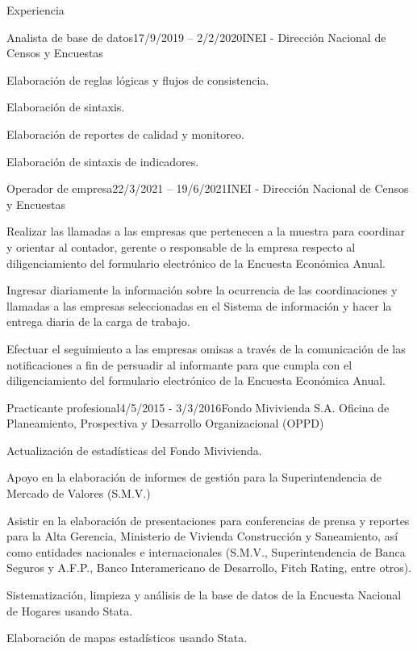 \documentclass[
11pt, %
]{resume} %
\begin{document}
\begin{rSection}{Experiencia}
			
			\begin{rSubsection}{Analista de base de datos}{17/9/2019 – 2/2/2020}{INEI - Dirección Nacional de Censos y Encuestas}{}
				\item Elaboración de reglas lógicas y flujos de consistencia.
				\item Elaboración de sintaxis.
				\item Elaboración de reportes de calidad y monitoreo.
				\item Elaboración de sintaxis de indicadores.
			\end{rSubsection}
			
			
			\begin{rSubsection}{Operador de empresa}{22/3/2021 – 19/6/2021}{INEI - Dirección Nacional de Censos y Encuestas}{}
				\item Realizar las llamadas a las empresas que pertenecen a la muestra para coordinar y orientar al contador, gerente o responsable de la empresa respecto al diligenciamiento del formulario electrónico de la Encuesta Económica Anual.
				\item Ingresar diariamente la información sobre la ocurrencia de las coordinaciones y llamadas a las empresas seleccionadas en el Sistema de información y hacer la entrega diaria de la carga de trabajo.
				\item Efectuar el seguimiento a las empresas omisas a través de la comunicación de las notificaciones a fin de persuadir al informante para que cumpla con el diligenciamiento del formulario electrónico de la Encuesta Económica Anual.
			\end{rSubsection}
			
			
			\begin{rSubsection}{Practicante profesional}{4/5/2015 - 3/3/2016}{Fondo Mivivienda S.A. Oficina de Planeamiento, Prospectiva y Desarrollo Organizacional (OPPD)}{}
				\item	Actualización de estadísticas del Fondo Mivivienda.
				\item	Apoyo en la elaboración de informes de gestión para la Superintendencia de Mercado de Valores (S.M.V.)
				\item	Asistir en la elaboración de presentaciones para conferencias de prensa y reportes para la Alta Gerencia, Ministerio de Vivienda Construcción y Saneamiento, así como entidades nacionales e internacionales (S.M.V., Superintendencia de Banca Seguros y A.F.P., Banco Interamericano de Desarrollo, Fitch Rating, entre otros).
				\item	Sistematización, limpieza y análisis de la base de datos de la Encuesta Nacional de Hogares usando Stata. 
				\item	Elaboración de mapas estadísticos usando Stata.
			\end{rSubsection}
			

\end{rSection}
\end{document}
